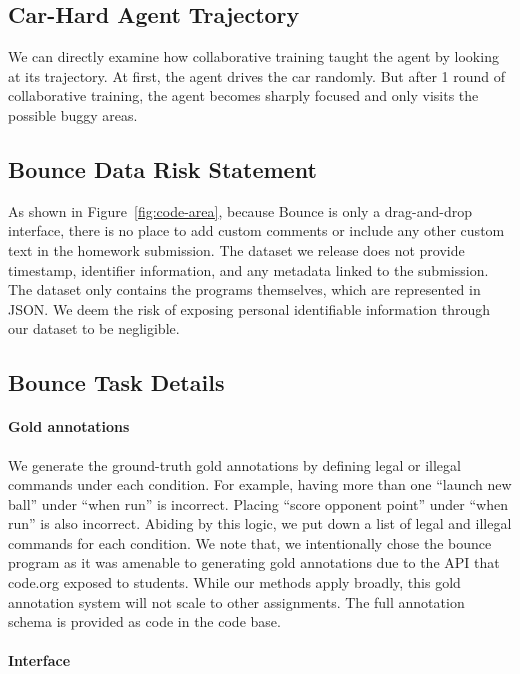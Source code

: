 \documentclass{article}
\begin{document}
\subsection{Car-Hard Agent Trajectory}

We can directly examine how collaborative training taught the agent by looking at its trajectory. At first, the agent drives the car randomly. But after 1 round of collaborative training, the agent becomes sharply focused and only visits the possible buggy areas.






\subsection{Bounce Data Risk Statement}
\label{sec:data-security}

As shown in Figure~\ref{fig:code-area}, because Bounce is only a drag-and-drop interface, there is no place to add custom comments or include any other custom text in the homework submission. The dataset we release does not provide timestamp, identifier information, and any metadata linked to the submission. The dataset only contains the programs themselves, which are represented in JSON. We deem the risk of exposing personal identifiable information through our dataset to be negligible.

\subsection{Bounce Task Details}

\paragraph{Gold annotations} 
We generate the ground-truth gold annotations by defining legal or illegal commands under each condition. For example, having more than one ``launch new ball'' under ``when run'' is incorrect. Placing ``score opponent point'' under ``when run'' is also incorrect. Abiding by this logic, we put down a list of legal and illegal commands for each condition.  We note that, we intentionally chose the bounce program as it was amenable to generating gold annotations due to the API that code.org exposed to students. While our methods apply broadly, this gold annotation system will not scale to other assignments. The full annotation schema is provided as code in the code base.

\paragraph{Interface}
\end{document}
